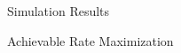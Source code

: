 \documentclass[journal]{IEEEtran}
\begin{document}
\begin{section}{Simulation Results}
\begin{subsection}{Achievable Rate Maximization}




\end{subsection}
\end{section}
\end{document}
